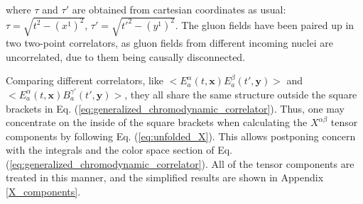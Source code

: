 where $\tau$ and $\tau'$ are obtained from cartesian coordinates as usual: $\tau = \sqrt{t^2 - (x^1)^2}$, $\tau' = \sqrt{t'^2 - (y^1)^2}$. The gluon fields have been paired up in two two-point correlators, as gluon fields from different incoming nuclei are uncorrelated, due to them being causally disconnected.

Comparing different correlators, like $\big< E^\alpha_a(t, \mathbf{x} ) E^\beta_a(t', \mathbf{y} )\big>$ and $\big< E^\alpha_a(t, \mathbf{x} ) B^{\gamma'}_a(t', \mathbf{y} )\big>$, they all share the same structure outside the square brackets in Eq. (\ref{eq:generalized_chromodynamic_correlator}). Thus, one may concentrate on the inside of the square brackets when calculating the $X^{\alpha \beta}$ tensor components by following Eq. (\ref{eq:unfolded_X}). This allows postponing concern with the integrals and the color space section of Eq. (\ref{eq:generalized_chromodynamic_correlator}). All of the tensor components are treated in this manner, and the simplified results are shown in Appendix \ref{X_components}.

